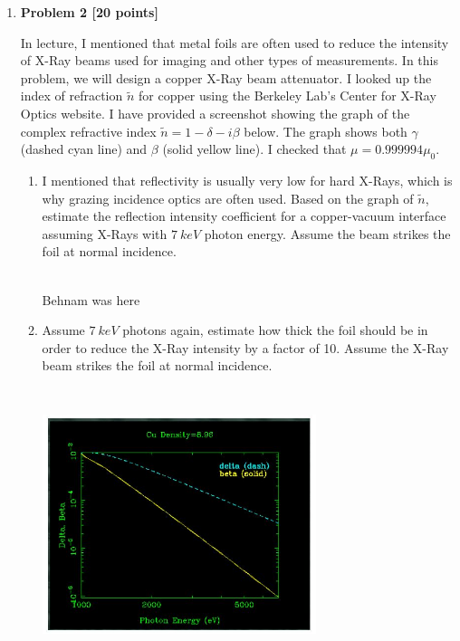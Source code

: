 \documentclass[fleqn]{article}
\begin{document}
\begin{enumerate}
\begin{enumerate}
    \end{enumerate}

  \item \textbf{Problem 2 [20 points]} 

  In lecture, I mentioned that metal foils are often used to reduce the intensity of X-Ray beams used for imaging 
  and other types of measurements. In this problem, we will design a copper X-Ray beam attenuator. I looked up the 
  index of refraction $\tilde{n}$ for copper using the Berkeley Lab's Center for X-Ray Optics website. I have 
  provided a screenshot showing the graph of the complex refractive index $\tilde{n}=1-\delta -i \beta$ below. The 
  graph shows both $\gamma$ (dashed cyan line) and $\beta$ (solid yellow line). I checked that $\mu=0.999994 \mu_0$.
    \begin{enumerate}
      \item I mentioned that reflectivity is usually very low for hard X-Rays, which is why grazing incidence
      optics are often used. Based on the graph of $\tilde{n}$, estimate the reflection intensity coefficient for a
      copper-vacuum interface assuming X-Rays with $7 ~ keV$ photon energy. Assume the beam strikes the foil at normal 
      incidence.

          \textcolor{hwColor}{
            \\
            Behnam was here
          }

      \item Assume $7 ~ keV$ photons again, estimate how thick the foil should be in order to reduce the
      X-Ray intensity by a factor of 10. Assume the X-Ray beam strikes the foil at normal incidence.

      \begin{center}
        \includegraphics[height=8cm, width=8cm]{1.JPG}
      \end{center}


\end{enumerate}
\end{enumerate}
\end{document}
